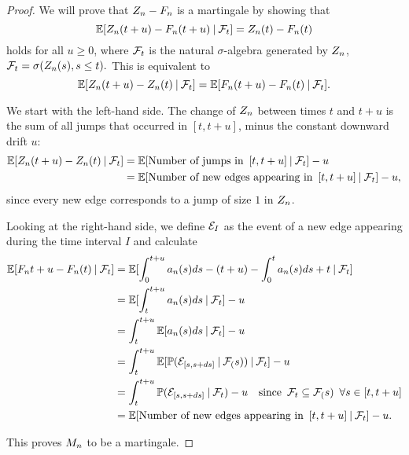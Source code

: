 \begin{proof} \label{P: decomp Zn}
	We will prove that $Z_n - F_n$ is a martingale by showing that
	\begin{equation} \label{E: Mn martingale}
	\mathbb{E}[ Z_n(t+u) - F_n(t+u) \: | \: \mathcal{F}_{t} ] = Z_n(t) - F_n(t)
	\end{equation}
	holds for all $u \geq 0$, where $\mathcal{F}_{t}$ is the natural $\sigma$-algebra generated by $Z_n$, 
	$\mathcal{F}_{t} = \sigma(Z_n(s), s \leq t).$
	This is equivalent to 
	\begin{equation}
	\mathbb{E}[Z_n(t+u) - Z_n(t) \: | \: \mathcal{F}_{t}] = \mathbb{E}[F_n(t+u) - F_n(t) \: | \: \mathcal{F}_{t}].
	\end{equation}
	
	We start with the left-hand side. 
	The change of $Z_n$ between times $t$ and $t+u$ is the sum of all jumps that occurred in $[t, t+u]$,
	minus the constant downward drift $u$:
	\begin{align*}
	\mathbb{E}[Z_n(t+u) - Z_n(t) \: | \: \mathcal{F}_{t}] 
	&= \mathbb{E}[\text{Number of jumps in} \enspace [t, t+u] \: | \: \mathcal{F}_{t}] - u \\
	&= \mathbb{E}[\text{Number of new edges appearing in} \enspace [t, t+u] \: | \: \mathcal{F}_{t}] - u,
	\end{align*}
	since every new edge corresponds to a jump of size $1$ in $Z_n$.
	
	Looking at the right-hand side, we define $\mathcal{E}_{I}$ as the event of a new edge appearing during the time interval $I$ and calculate
	\begin{align*}
	\mathbb{E}[F_n{t+u} - F_n(t) \: | \: \mathcal{F}_{t}]
	&= \mathbb{E}[ \int_{0}^{t+u} a_n(s)ds - (t+u) - \int_{0}^{t} a_n(s)ds + t \: | \: \mathcal{F}_{t} ] \\
	&= \mathbb{E}[ \int_{t}^{t+u} a_n(s)ds \: | \: \mathcal{F}_{t} ] - u \\
	&= \int_{t}^{t+u} \mathbb{E}[a_n(s)ds \: | \: \mathcal{F}_{t}] - u \\
	&= \int_{t}^{t+u} \mathbb{E}[ \mathbb{P}(\mathcal{E}_{[s, s+ds]} \: | \: \mathcal{F}_{(}s)) \: | \: \mathcal{F}_{t} ] - u\\
	&= \int_{t}^{t+u} \mathbb{P}( \mathcal{E}_{[s, s+ds]} \: | \: \mathcal{F}_{t} ) - u
	\quad \text{since} \enspace \mathcal{F}_{t} \subseteq \mathcal{F}_{(}s) \enspace \forall s \in [t,t+u] \\
	&= \mathbb{E}[\text{Number of new edges appearing in} \enspace [t, t+u] \: | \: \mathcal{F}_{t}] - u.
	\end{align*}
	
	This proves $M_n$ to be a martingale. 	
\end{proof}

